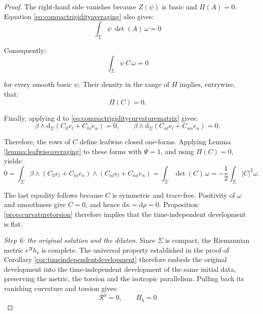 \documentclass[10pt,reqno,a4paper]{amsart}
\theoremstyle{plain}
\theoremstyle{definition}
\theoremstyle{remark}
\theoremstyle{remark}
\def\dd{\mathrm{d}}
\def\cR{{\mathcal R}}
\def\fre{\mathfrak{e}}
\renewcommand{\(}{ (}
\renewcommand{\)}{ )}
\newcommand{\frf}{\mathfrak{f}}
\begin{document}
\begin{proof}
\noindent
The right-hand side vanishes because $Z(\psi)$ is basic and $\Pi(A)=0$. Equation \eqref{eq:compactrigidityaveraging} also gives:
\begin{equation*}
\int_{\Sigma}\psi\,\det(A)\,\omega=0    
\end{equation*}

\noindent
Consequently:
\begin{equation*}
\int_{\Sigma}\psi\, C\,\omega=0
\end{equation*}
	
\noindent
for every smooth basic $\psi$. Their density in the range of $\Pi$ implies, entrywise, that:
\begin{equation*}
\Pi(C)=0.
\end{equation*}
	
\noindent
Finally, applying $\dd$ to \eqref{eq:compactrigiditycurvaturematrix} gives:
\begin{equation*}
\beta\wedge\dd_{\Sigma}(C_{ll}e_l+C_{ln}e_n)=0, \qquad \beta\wedge\dd_{\Sigma}(C_{nl}e_l+C_{nn}e_n)=0.
\end{equation*}
	
\noindent
Therefore, the rows of $C$ define leafwise closed one-forms. Applying Lemma \ref{lemma:leafwiseaveraging} to these forms with $\Psi=1$, and using $\Pi(C)=0$, yields:
\begin{equation*}
0 = \int_{\Sigma} \beta\wedge(C_{ll}e_l+C_{ln}e_n) \wedge(C_{nl}e_l+C_{nn}e_n) = \int_{\Sigma}\det(C)\,\omega = -\frac{1}{2}\int_{\Sigma}\vert C\vert^2\omega.
\end{equation*}
	
\noindent
The last equality follows because $C$ is symmetric and trace-free. Positivity of $\omega$ and smoothness give $C=0$, and hence $\dd\kappa=\dd\rho=0$. Proposition \ref{prop:curvaturetorsion} therefore implies that the time-independent development is flat.
	
\medskip
\noindent
\emph{Step 6: the original solution and the dilaton.}
Since $\Sigma$ is compact, the Riemannian metric $e^{2\frf}h_{\fre}$ is complete. The universal property established in the proof of Corollary \ref{cor:timeindependentdevelopment} therefore embeds the original development into the time-independent development of the same initial data, preserving the metric, the torsion and the isotropic parallelism. Pulling back its vanishing curvature and torsion gives:
\begin{equation*}
\cR^g=0, \qquad H_{\bar b}=0
\end{equation*}
	

\end{proof}
\end{document}
